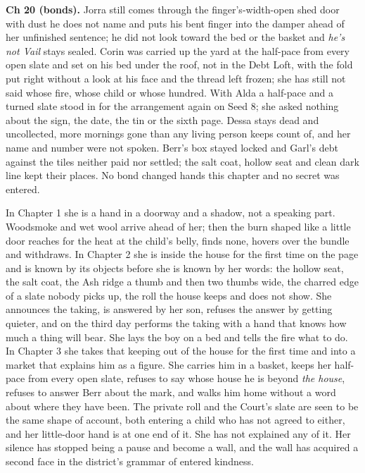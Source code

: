 \documentclass{design/chronicle}
\begin{document}
{\textbf{Ch 20 (bonds).} Jorra still comes through the finger’s-width-open shed door with dust he does not name and puts his bent finger into the damper ahead of her unfinished sentence; he did not look toward the bed or the basket and \emph{he’s not Vail} stays sealed. Corin was carried up the yard at the half-pace from every open slate and set on his bed under the roof, not in the Debt Loft, with the fold put right without a look at his face and the thread left frozen; she has still not said whose fire, whose child or whose hundred. With Alda a half-pace and a turned slate stood in for the arrangement again on Seed 8; she asked nothing about the sign, the date, the tin or the sixth page. Dessa stays dead and uncollected, more mornings gone than any living person keeps count of, and her name and number were not spoken. Berr’s box stayed locked and Garl’s debt against the tiles neither paid nor settled; the salt coat, hollow seat and clean dark line kept their places. No bond changed hands this chapter and no secret was entered.

In Chapter 1 she is a hand in a doorway and a shadow, not a speaking part. Woodsmoke and wet wool arrive ahead of her; then the burn shaped like a little door reaches for the heat at the child’s belly, finds none, hovers over the bundle and withdraws. In Chapter 2 she is inside the house for the first time on the page and is known by its objects before she is known by her words: the hollow seat, the salt coat, the Ash ridge a thumb and then two thumbs wide, the charred edge of a slate nobody picks up, the roll the house keeps and does not show. She announces the taking, is answered by her son, refuses the answer by getting quieter, and on the third day performs the taking with a hand that knows how much a thing will bear. She lays the boy on a bed and tells the fire what to do. In Chapter 3 she takes that keeping out of the house for the first time and into a market that explains him as a figure. She carries him in a basket, keeps her half-pace from every open slate, refuses to say whose house he is beyond \emph{the house}, refuses to answer Berr about the mark, and walks him home without a word about where they have been. The private roll and the Court’s slate are seen to be the same shape of account, both entering a child who has not agreed to either, and her little-door hand is at one end of it. She has not explained any of it. Her silence has stopped being a pause and become a wall, and the wall has acquired a second face in the district’s grammar of entered kindness.

}
\end{document}
